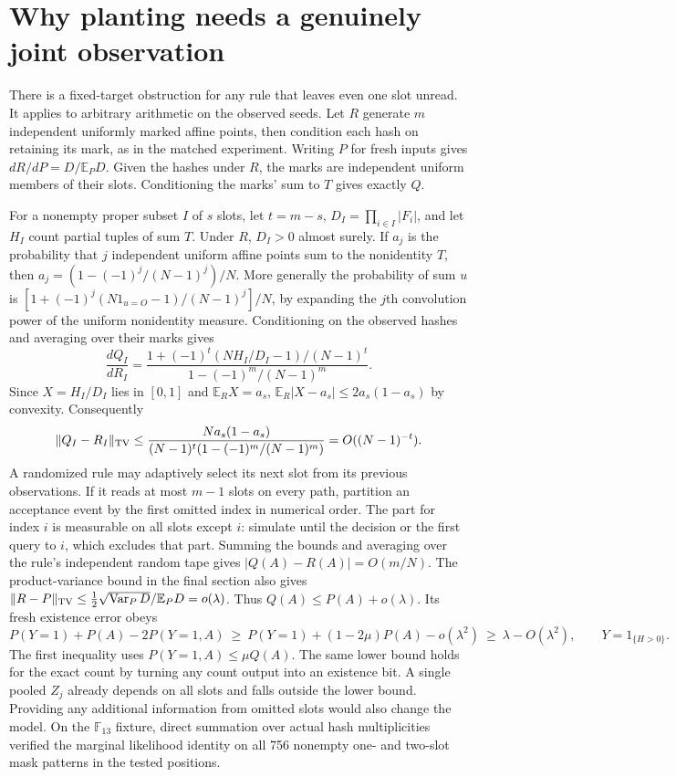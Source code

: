 \documentclass[11pt]{article}
\newcommand{\F}{\mathbb F}
\newcommand{\E}{\mathbb E}
\begin{document}
\section{Why planting needs a genuinely joint observation}
There is a fixed-target obstruction for any rule that leaves even one
slot unread. It applies to arbitrary arithmetic on the observed seeds.
Let $R$ generate $m$ independent uniformly marked affine points, then
condition each hash on retaining its mark, as in the matched experiment.
Writing $P$ for fresh inputs gives $dR/dP=D/\E_P D$. Given the hashes
under $R$, the marks are independent uniform members of their slots.
Conditioning the marks' sum to $T$ gives exactly $Q$.

For a nonempty proper subset $I$ of $s$ slots, let $t=m-s$,
$D_I=\prod_{i\in I}|F_i|$, and let $H_I$ count partial tuples of sum $T$.
Under $R$, $D_I>0$ almost surely. If $a_j$ is the probability that $j$
independent uniform affine points sum to the nonidentity $T$, then
$a_j=(1-(-1)^j/(N-1)^j)/N$. More generally the probability of sum $u$
is $[1+(-1)^j(N1_{u=O}-1)/(N-1)^j]/N$, by expanding the $j$th
convolution power of the uniform nonidentity measure. Conditioning
on the observed hashes and averaging over their marks gives
\[
 \frac{dQ_I}{dR_I}=
 \frac{1+(-1)^t(NH_I/D_I-1)/(N-1)^t}{1-(-1)^m/(N-1)^m}.
\]
Since $X=H_I/D_I$ lies in $[0,1]$ and $\E_R X=a_s$,
$\E_R|X-a_s|\le 2a_s(1-a_s)$ by convexity. Consequently
\[
 \|Q_I-R_I\|_{\rm TV}\le
 \frac{Na_s(1-a_s)}{(N-1)^t(1-(-1)^m/(N-1)^m)}
 =O((N-1)^{-t}).
\]
A randomized rule may adaptively select its next slot from its previous
observations. If it reads at most $m-1$ slots on every path, partition
an acceptance event by the first omitted index in numerical order.
The part for index $i$ is measurable on all slots except $i$: simulate
until the decision or the first query to $i$, which excludes that part.
Summing the bounds and averaging over the rule's independent random tape
gives $|Q(A)-R(A)|=O(m/N)$. The product-variance bound in the final
section also gives $\|R-P\|_{\rm TV}\le
\tfrac12\sqrt{\operatorname{Var}_P D}/\E_P D=o(\lambda)$.
Thus $Q(A)\le P(A)+o(\lambda)$. Its fresh existence error obeys
\[
 P(Y=1)+P(A)-2P(Y=1,A)
 \ \ge\ P(Y=1)+(1-2\mu)P(A)-o(\lambda^2)
 \ \ge\ \lambda-O(\lambda^2),
 \qquad Y=1_{\{H>0\}}.
\]
The first inequality uses $P(Y=1,A)\le\mu Q(A)$. The same lower bound
holds for the exact count by turning any count output into an existence
bit. A single pooled $Z_j$ already depends on all
slots and falls outside the lower bound. Providing any additional
information from omitted slots would also change the model.
On the $\F_{13}$ fixture, direct summation over actual hash
multiplicities verified the marginal likelihood identity on all 756
nonempty one- and two-slot mask patterns in the tested positions.
\end{document}
